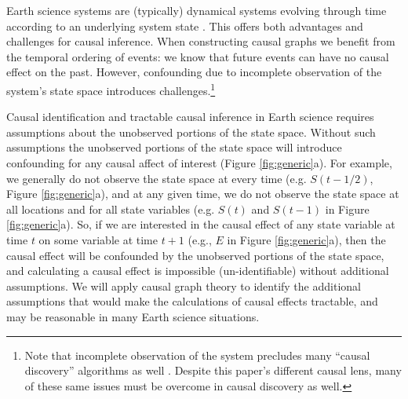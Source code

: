 \documentclass[12pt]{article}
\begin{document}
Earth science systems are (typically) dynamical systems evolving
through time according to an underlying system state
\citep{lorenz-1963,lorenz1996predictability,majda-state}. This offers
both advantages and challenges for causal inference. When constructing
causal graphs we benefit from the temporal ordering of events: we know
that future events can have no causal effect on the past. However,
confounding due to incomplete observation of the system's state space
introduces challenges.\footnote{Note that incomplete observation of
  the system precludes many ``causal discovery'' algorithms as well
  \citep[see ][ for a great review]{runge2019inferring}. Despite this
  paper's different causal lens, many of these same issues must be
  overcome in causal discovery as well.}

Causal identification and tractable causal inference in Earth science
requires assumptions about the unobserved portions of the state
space. Without such assumptions the unobserved portions of the state
space will introduce confounding for any causal affect of interest
(Figure \ref{fig:generic}a). For example, we generally do not observe
the state space at every time (e.g. $S(t-1/2)$, Figure
\ref{fig:generic}a), and at any given time, we do not observe the
state space at all locations and for all state variables (e.g. $S(t)$
and $S(t-1)$ in Figure \ref{fig:generic}a). So, if we are interested
in the causal effect of any state variable at time $t$ on some
variable at time $t+1$ (e.g., $E$ in Figure \ref{fig:generic}a), then
the causal effect will be confounded by the unobserved portions of the
state space, and calculating a causal effect is impossible
(un-identifiable) without additional assumptions. We will apply causal
graph theory to identify the additional assumptions that would make
the calculations of causal effects tractable, and may be reasonable in
many Earth science situations.
\end{document}
